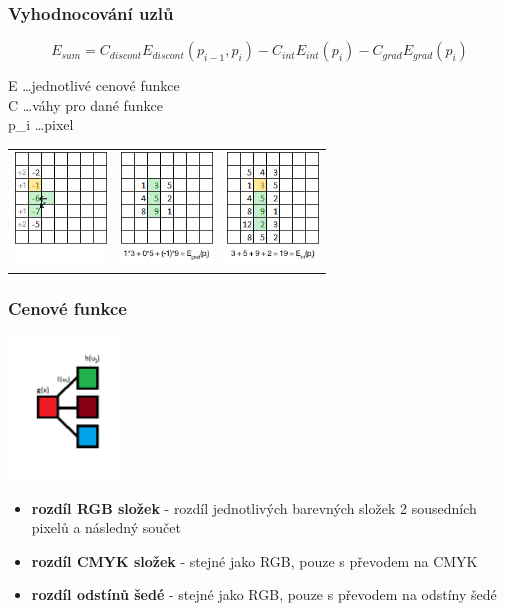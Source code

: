 \documentclass{beamer}
\begin{document}
	\begin{frame}[t,fragile]
		\frametitle{Vyhodnocování uzlů}	

		$$ E_{sum} = C_{discont}E_{discont}(p_{i-1},p_{i})-C_{int}E_{int}(p_{i})-C_{grad}E_{grad}(p_{i}) $$
		
		E \ldots jednotlivé cenové funkce \\
		C \ldots váhy pro dané funkce \\
		p_{i} \ldots pixel
		
		\vspace{5mm}\centering
		\begin{tabular}{lll}
			\vspace{-5mm}\includegraphics[height=30mm]{disc.jpg} &		
			\includegraphics[height=30mm]{grad.jpg} &
			\includegraphics[height=30mm]{int.jpg}
		\end{tabular}
		

	\end{frame}
	
	\begin{frame}[t,fragile]
		\frametitle{Cenové funkce}	
\centering	\includegraphics[height=38mm]{cenovefce.png}
\vspace{-5mm}
	\begin{itemize}
		\item \textbf{rozdíl RGB složek} - rozdíl jednotlivých barevných složek 2 sousedních pixelů a následný součet
		\item \textbf{rozdíl CMYK složek} - stejné jako RGB, pouze s převodem na CMYK
		\item \textbf{rozdíl odstínů šedé} - stejné jako RGB, pouze s převodem na odstíny šedé
	\end{itemize}
		
	\end{frame}
	
\end{document}
